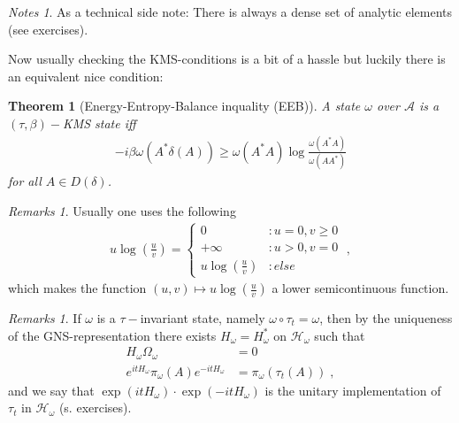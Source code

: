 \documentclass[
a4paper, %
11pt, %
onecolumn, %
openany, %
]{memoir}
\theoremstyle{definition}
\theoremstyle{remark}
\newtheorem{remarks}[definition]{Remarks}
\newtheorem{notes}[definition]{Notes}
\theoremstyle{plain}
\newtheorem{theorem}[definition]{Theorem}
\begin{document}
\begin{notes}
As a technical side note: There is always a dense set of analytic elements (see exercises).
\end{notes}
Now usually checking the KMS-conditions is a bit of a hassle but luckily there is an equivalent nice condition: \begin{theorem}[Energy-Entropy-Balance inquality (EEB)]
	A state $\omega$ over $\mathcal{A}$ is a $(\tau,\beta)-$KMS state iff\begin{align} -i\beta\omega(A^*\delta(A))\geq \omega(A^*A)\log \frac{\omega(A^*A)}{\omega(AA^*)}\end{align}
	for all $A\in D(\delta)$.
\end{theorem}
\begin{remarks}
	Usually one uses the following \begin{align}
	u\log\left(\frac{u}{v}\right)=\begin{cases}
	0&\colon u=0, v\geq 0\\
	+\infty &\colon u> 0, v=0\\
	u\log\left(\frac{u}{v}\right)&\colon else
	\end{cases}\; ,
	\end{align}
	which makes the function $(u,v)\mapsto u\log\left(\frac{u}{v}\right)$ a lower semicontinuous function.
\end{remarks}
\begin{remarks}
	If $\omega$ is a $\tau-$invariant state, namely $\omega\circ \tau_t=\omega$, then by the uniqueness of the GNS-representation there exists $H_{\omega}=H_{\omega}^*$ on $\mathcal{H}_{\omega}$ such that \begin{align}
		H_{\omega}\Omega_{\omega}&=0\\
		e^{itH_{\omega}}\pi_{\omega}(A)e^{-itH_{\omega}}&=\pi_{\omega}(\tau_t(A))\;,
		\end{align}
		and we say that $\exp(itH_{\omega})\cdot \exp(-itH_{\omega})$ is the unitary implementation of $\tau_t$ in $\mathcal{H}_{\omega}$ (s. exercises). 
\end{remarks}		
\end{document}
